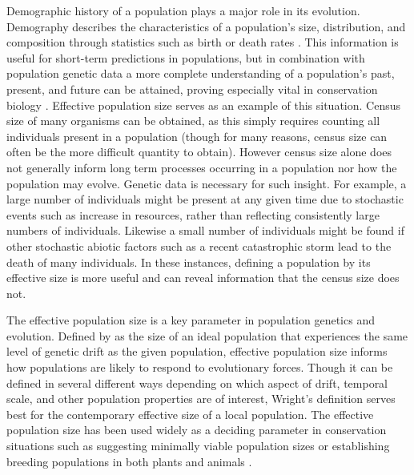 Demographic history of a population plays a major role in its evolution. Demography describes the characteristics of a population's size, distribution, and composition through statistics such as birth or death rates \citep{Pavlik:2000}. This information is useful for short-term predictions in populations, but in combination with population genetic data a more complete understanding of a population's past, present, and future can be attained, proving especially vital in conservation biology \citep{Lande:1988, Avise:1995, Nunney:1993}. Effective population size serves as an example of this situation. Census size of many organisms can be obtained, as this simply requires counting all individuals present in a population (though for many reasons, census size can often be the more difficult quantity to obtain). However census size alone does not generally inform long term processes occurring in a population nor how the population may evolve. Genetic data is necessary for such insight. For example, a large number of individuals might be present at any given time due to stochastic events such as increase in resources, rather than reflecting consistently large numbers of individuals. Likewise a small number of individuals might be found if other stochastic abiotic factors such as a recent catastrophic storm lead to the death of many individuals. In these instances, defining a population by its effective size is more useful and can reveal information that the census size does not. 

The effective population size is a key parameter in population genetics and evolution. Defined by \citet{Wright:1931} as the size of an ideal population that experiences the same level of genetic drift as the given population, effective population size informs how populations are likely to respond to evolutionary forces. Though it can be defined in several different ways depending on which aspect of drift, temporal scale, and other population properties are of interest, Wright's definition serves best for the contemporary effective size of a local population. The effective population size has been used widely as a deciding parameter in conservation situations such as suggesting minimally viable population sizes or establishing breeding populations in both plants and animals \citep{Lande:1987, Soule:1987, Ellstrand:1993}.

